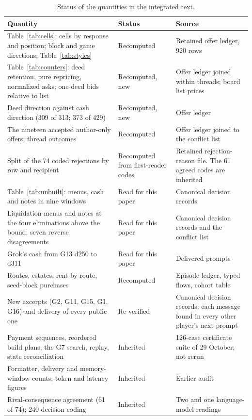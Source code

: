 \begin{table}[H]
\centering\footnotesize
\renewcommand{\arraystretch}{1.1}
\begin{tabularx}{\linewidth}{@{}YL{2.2cm}L{5.4cm}@{}}
\toprule
Quantity & Status & Source\\
\midrule
Table~\ref{tab:cells}: cells by response and position; block and game directions; Table~\ref{tab:styles} & Recomputed & Retained offer ledger, 920 rows\\
Table~\ref{tab:counters}: deed retention, pure repricing, normalized asks; one-deed bids relative to list & Recomputed, new & Offer ledger joined within threads; board list prices\\
Deed direction against cash direction (309 of 313; 373 of 429) & Recomputed, new & Offer ledger\\
The nineteen accepted author-only offers; thread outcomes & Recomputed & Offer ledger joined to the conflict list\\
Split of the 74 coded rejections by row and recipient & Recomputed from first-reader codes & Retained rejection-reason file. The 61 agreed codes are inherited\\
Table~\ref{tab:unbuilt}: menus, cash and notes in nine windows & Read for this paper & Canonical decision records\\
Liquidation menus and notes at the four eliminations above the bound; seven reverse disagreements & Read for this paper & Canonical decision records and the conflict list\\
Grok's cash from G13 d250 to d311 & Read for this paper & Delivered prompts\\
Routes, estates, rent by route, seed-block purchases & Recomputed & Episode ledger, typed flows, cohort table\\
New excerpts (G2, G11, G15, G1, G16) and delivery of every public one & Re-verified & Canonical decision records; each message found in every other player's next prompt\\
Payment sequences, reordered build plans, the G7 search, replay, state reconciliation & Inherited & 126-case certificate suite of 29 October; not rerun\\
Formatter, delivery and memory-window counts; token and latency figures & Inherited & Earlier audit\\
Rival-consequence agreement (61 of 74); 240-decision coding & Inherited & Two and one language-model readings\\
\bottomrule
\end{tabularx}
\caption{Status of the quantities in the integrated text.}
\end{table}

